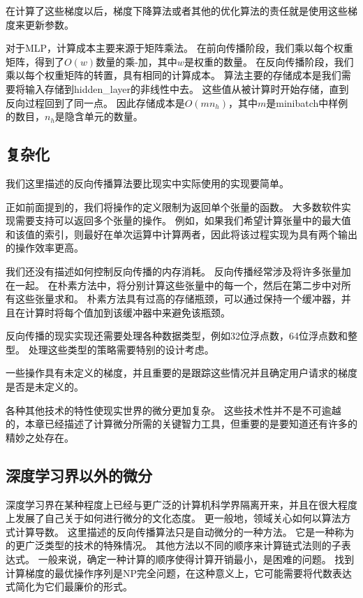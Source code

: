 在计算了这些梯度以后，梯度下降算法或者其他的优化算法的责任就是使用这些梯度来更新参数。

对于MLP，计算成本主要来源于矩阵乘法。
在前向传播阶段，我们乘以每个权重矩阵，得到了$O(w)$数量的乘-加，其中$w$是权重的数量。
在反向传播阶段，我们乘以每个权重矩阵的转置，具有相同的计算成本。
算法主要的存储成本是我们需要将输入存储到\gls{hidden_layer}的非线性中去。
这些值从被计算时开始存储，直到反向过程回到了同一点。
因此存储成本是$O(mn_h)$，其中$m$是minibatch中样例的数目，$n_h$是隐含单元的数量。
  
  
\subsection{复杂化}
\label{sec:complications}

我们这里描述的反向传播算法要比现实中实际使用的实现要简单。

正如前面提到的，我们将操作的定义限制为返回单个张量的函数。
大多数软件实现需要支持可以返回多个张量的操作。 
例如，如果我们希望计算张量中的最大值和该值的索引，则最好在单次运算中计算两者，因此将该过程实现为具有两个输出的操作效率更高。

我们还没有描述如何控制反向传播的内存消耗。
反向传播经常涉及将许多张量加在一起。
在朴素方法中，将分别计算这些张量中的每一个，然后在第二步中对所有这些张量求和。 
朴素方法具有过高的存储瓶颈，可以通过保持一个缓冲器，并且在计算时将每个值加到该缓冲器中来避免该瓶颈。

反向传播的现实实现还需要处理各种数据类型，例如32位浮点数，64位浮点数和整型。
处理这些类型的策略需要特别的设计考虑。

一些操作具有未定义的梯度，并且重要的是跟踪这些情况并且确定用户请求的梯度是否是未定义的。

各种其他技术的特性使现实世界的微分更加复杂。 这些技术性并不是不可逾越的，本章已经描述了计算微分所需的关键智力工具，但重要的是要知道还有许多的精妙之处存在。
  
  
\subsection{深度学习界以外的微分}
\label{sec:differentiation_outside_the_deep_learning_community}

深度学习界在某种程度上已经与更广泛的计算机科学界隔离开来，并且在很大程度上发展了自己关于如何进行微分的文化态度。
更一般地，领域关心如何以算法方式计算导数。 
这里描述的反向传播算法只是自动微分的一种方法。 
它是一种称为的更广泛类型的技术的特殊情况。 
其他方法以不同的顺序来计算链式法则的子表达式。 
一般来说，确定一种计算的顺序使得计算开销最小，是困难的问题。 
找到计算梯度的最优操作序列是NP完全问题\citep{naumann2008optimal}，在这种意义上，它可能需要将代数表达式简化为它们最廉价的形式。

